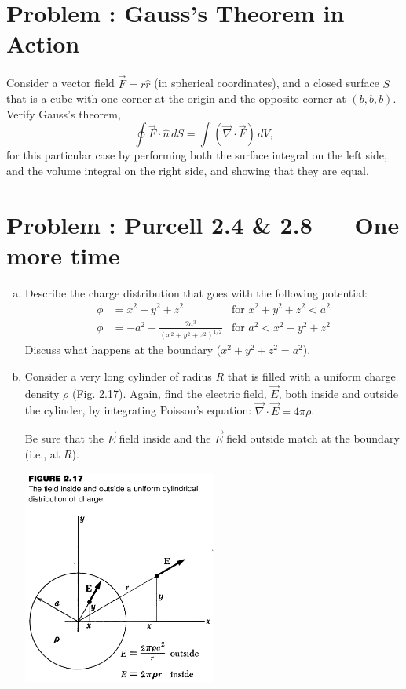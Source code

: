 \documentclass[problems]{esg8022pset}
\begin{document}
\section{Problem \thesection: Gauss's Theorem in Action}
  Consider a vector field
  $\vec{F} = r\hat{r}$ (in spherical coordinates), and a closed
  surface $S$ that is a cube with one corner at the origin and the
  opposite corner at $(b,b,b)$.  Verify Gauss's theorem,
  $$\oint \vec{F}\cdot\hat{n}\,dS = \int (\vec{\nabla}\cdot\vec{F})\,dV,$$
  for this particular case by performing both the surface integral on the
  left side, and the volume integral on the right side, and showing that
  they are equal.
\section{Problem \thesection: Purcell 2.4 \& 2.8 --- One more time}
  \begin{enumerate}[(a)]
    \item Describe the charge distribution that goes with the following potential:
      \begin{align*}
        \phi & = x^2 + y^2 + z^2 & \text{for }x^2 + y^2 + z^2 < a^2 \\
        \phi & = -a^2 + \frac{2a^3}{(x^2 + y^2 + z^2)^{1/2}} & \text{for }a^2 < x^2 + y^2 + z^2
      \end{align*}
      Discuss what happens at the boundary ($x^2 + y^2 + z^2 = a^2$).
    \item Consider a very long cylinder of radius $R$ that is filled with a uniform charge density $\rho$ (Fig. 2.17).  Again, find the electric field, $\vec{E}$, both inside and outside the cylinder, by integrating Poisson's equation: $\vec{\nabla} \cdot \vec{E} = 4 \pi \rho$.

      Be sure that the $\vec E$ field inside and the $\vec E$ field outside match at the boundary (i.e., at $R$).
      \begin{center}\includegraphics[width=0.5\textwidth]{ps02_2}\end{center}
  \end{enumerate}
\end{document}
